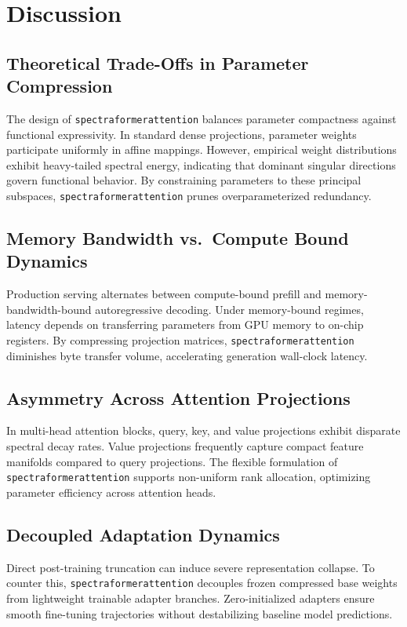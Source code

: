 \section{Discussion}

\subsection{Theoretical Trade-Offs in Parameter Compression}
The design of \texttt{spectraformerattention} balances parameter compactness against functional expressivity. In standard dense projections, parameter weights participate uniformly in affine mappings. However, empirical weight distributions exhibit heavy-tailed spectral energy, indicating that dominant singular directions govern functional behavior. By constraining parameters to these principal subspaces, \texttt{spectraformerattention} prunes overparameterized redundancy.

\subsection{Memory Bandwidth vs.\ Compute Bound Dynamics}
Production serving alternates between compute-bound prefill and memory-bandwidth-bound autoregressive decoding. Under memory-bound regimes, latency depends on transferring parameters from GPU memory to on-chip registers. By compressing projection matrices, \texttt{spectraformerattention} diminishes byte transfer volume, accelerating generation wall-clock latency.

\subsection{Asymmetry Across Attention Projections}
In multi-head attention blocks, query, key, and value projections exhibit disparate spectral decay rates. Value projections frequently capture compact feature manifolds compared to query projections. The flexible formulation of \texttt{spectraformerattention} supports non-uniform rank allocation, optimizing parameter efficiency across attention heads.

\subsection{Decoupled Adaptation Dynamics}
Direct post-training truncation can induce severe representation collapse. To counter this, \texttt{spectraformerattention} decouples frozen compressed base weights from lightweight trainable adapter branches. Zero-initialized adapters ensure smooth fine-tuning trajectories without destabilizing baseline model predictions.

